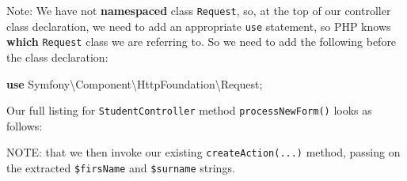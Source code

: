 \documentclass[a4paperpaper,openright]{book}
\newenvironment{Shaded}{}{}
\newcommand{\AnnotationTok}[1]{\textcolor[rgb]{0.38,0.63,0.69}{\textbf{\textit{#1}}}}
\newcommand{\CommentTok}[1]{\textcolor[rgb]{0.38,0.63,0.69}{\textit{#1}}}
\newcommand{\KeywordTok}[1]{\textcolor[rgb]{0.00,0.44,0.13}{\textbf{#1}}}
\newcommand{\NormalTok}[1]{#1}
\newcommand{\OtherTok}[1]{\textcolor[rgb]{0.00,0.44,0.13}{#1}}
\newcommand{\StringTok}[1]{\textcolor[rgb]{0.25,0.44,0.63}{#1}}
\begin{document}
\begin{Shaded}
\end{Shaded}

Note: We have not \textbf{namespaced} class \texttt{Request}, so, at the
top of our controller class declaration, we need to add an appropriate
\texttt{use} statement, so PHP knows \textbf{which} \texttt{Request}
class we are referring to. So we need to add the following before the
class declaration:

\begin{Shaded}
\begin{Highlighting}[]
    \KeywordTok{use}\NormalTok{ Symfony\textbackslash{}Component\textbackslash{}HttpFoundation\textbackslash{}Request}\OtherTok{;}
\end{Highlighting}
\end{Shaded}

Our full listing for \texttt{StudentController} method
\texttt{processNewForm()} looks as follows:

\begin{Shaded}
\end{Shaded}

NOTE: that we then invoke our existing \texttt{createAction(...)}
method, passing on the extracted \texttt{\$firsName} and
\texttt{\$surname} strings.
\end{document}
